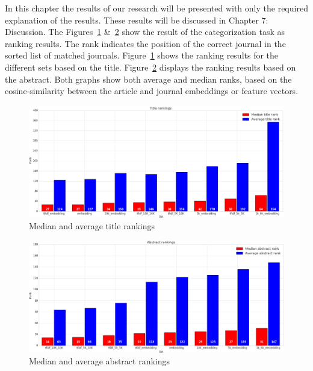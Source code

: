 \documentclass[../../Thesis.tex]{subfiles}
\begin{document}
In this chapter the results of our research will be presented with only the required explanation of the results. These results will be discussed in Chapter 7: Discussion.
The Figures~\ref{figure:titleRanks} \&~\ref{figure:abstractRanks} show the result of the categorization task as ranking results. The rank indicates the position of the correct journal in the sorted list of matched journals. Figure~\ref{figure:titleRanks} shows the ranking results for the different sets based on the title. Figure~\ref{figure:abstractRanks} displays the ranking results based on the abstract. Both graphs show both average and median ranks, based on the cosine-similarity between the article and journal embeddings or feature vectors.
\clearpage
\begin{figure}[hbt]
\includegraphics[width=6.5in]{Plots/Title_rankings}
\caption{Median and average title rankings}\label{figure:titleRanks}
\end{figure}
\begin{figure}[hbt]
\includegraphics[width=6.5in]{Plots/Abstract_rankings}
\caption{Median and average abstract rankings}\label{figure:abstractRanks}
\end{figure}
\clearpage
{}
\end{document}
